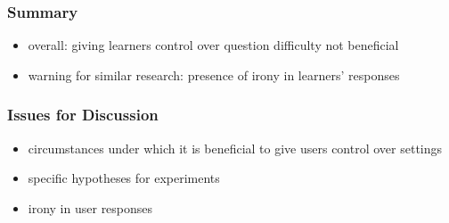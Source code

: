 \documentclass[bigger]{beamer}
\begin{document}
\begin{frame}
  \frametitle{Summary}

  \begin{itemize}
  \item overall: giving learners control over question difficulty not beneficial
  \item warning for similar research: presence of irony in learners' responses
  \end{itemize}
\end{frame}

\begin{frame}
  \frametitle{Issues for Discussion}

  \begin{itemize}
  \item circumstances under which it is beneficial to give users control over
    settings
  \item specific hypotheses for experiments
  \item irony in user responses
  \end{itemize}
\end{frame}
\end{document}

